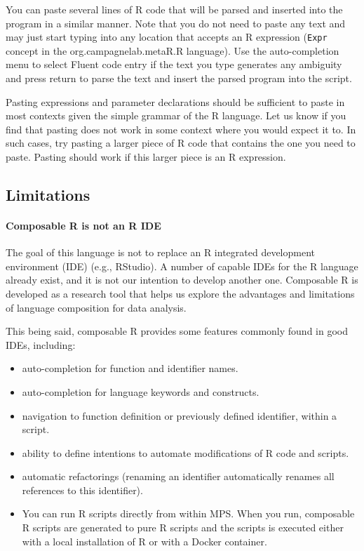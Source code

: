You can paste several lines of R code that will be parsed and inserted into the program in a similar manner. Note that you do not need to paste any text and may just start typing into any location that accepts an R expression (\texttt{Expr} concept in the org.campagnelab.metaR.R language). Use the auto-completion menu to select Fluent code entry if the text you type generates any ambiguity and press return to parse the text and insert the parsed program into the script. 

\begin{remark}
Pasting expressions and parameter declarations should be sufficient to paste in most contexts given the simple grammar of the R language. Let us know if you find that pasting does not work in some context where you would expect it to. In such cases, try pasting a larger piece of R code that contains the one you need to paste. Pasting should work if this larger piece is an R expression. 
\end{remark}


\subsection{Limitations}

\paragraph{Composable R is not an R IDE}

The goal of this language is not to replace an R integrated development environment (IDE) (e.g., RStudio). A number of capable IDEs for the R language already exist, and it is not our intention to develop another one.  Composable R is developed as a research tool that helps us explore the advantages and limitations of language composition for data analysis.

This being said, composable R  provides some features commonly found in good IDEs, including:
\begin{itemize}
  \item auto-completion for function and identifier names.
  \item auto-completion for language keywords and constructs.
  \item navigation to function definition or previously defined identifier, within a script.
  \item ability to define intentions to automate modifications of R code and scripts.
  \item automatic refactorings (renaming an identifier automatically renames all references to this identifier).
  \item You can run R scripts directly from within MPS. When you run, composable R scripts are generated to pure R scripts and the scripts is executed either with a local installation of R or with a Docker container. 
\end{itemize}



